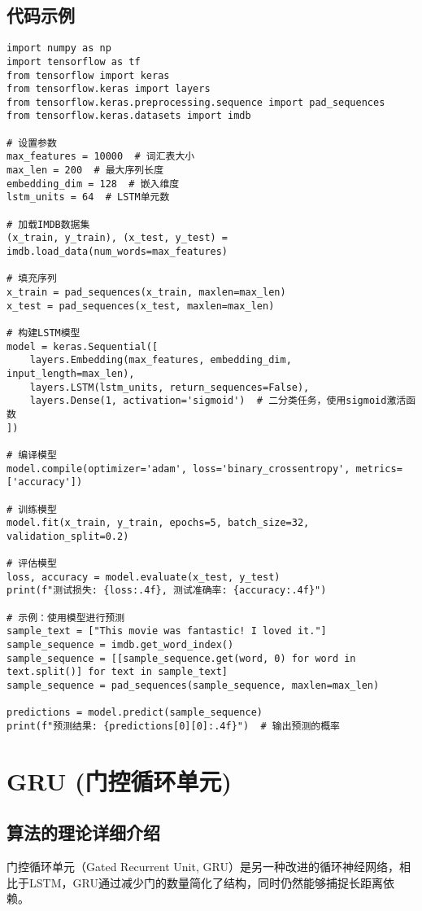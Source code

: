 \subsection*{代码示例}
\begin{lstlisting}
import numpy as np
import tensorflow as tf
from tensorflow import keras
from tensorflow.keras import layers
from tensorflow.keras.preprocessing.sequence import pad_sequences
from tensorflow.keras.datasets import imdb

# 设置参数
max_features = 10000  # 词汇表大小
max_len = 200  # 最大序列长度
embedding_dim = 128  # 嵌入维度
lstm_units = 64  # LSTM单元数

# 加载IMDB数据集
(x_train, y_train), (x_test, y_test) = imdb.load_data(num_words=max_features)

# 填充序列
x_train = pad_sequences(x_train, maxlen=max_len)
x_test = pad_sequences(x_test, maxlen=max_len)

# 构建LSTM模型
model = keras.Sequential([
    layers.Embedding(max_features, embedding_dim, input_length=max_len),
    layers.LSTM(lstm_units, return_sequences=False),
    layers.Dense(1, activation='sigmoid')  # 二分类任务，使用sigmoid激活函数
])

# 编译模型
model.compile(optimizer='adam', loss='binary_crossentropy', metrics=['accuracy'])

# 训练模型
model.fit(x_train, y_train, epochs=5, batch_size=32, validation_split=0.2)

# 评估模型
loss, accuracy = model.evaluate(x_test, y_test)
print(f"测试损失: {loss:.4f}, 测试准确率: {accuracy:.4f}")

# 示例：使用模型进行预测
sample_text = ["This movie was fantastic! I loved it."]
sample_sequence = imdb.get_word_index()
sample_sequence = [[sample_sequence.get(word, 0) for word in text.split()] for text in sample_text]
sample_sequence = pad_sequences(sample_sequence, maxlen=max_len)

predictions = model.predict(sample_sequence)
print(f"预测结果: {predictions[0][0]:.4f}")  # 输出预测的概率

\end{lstlisting}


\section{GRU (门控循环单元)}
\subsection*{算法的理论详细介绍}
门控循环单元（Gated Recurrent Unit, GRU）是另一种改进的循环神经网络，相比于LSTM，GRU通过减少门的数量简化了结构，同时仍然能够捕捉长距离依赖。


